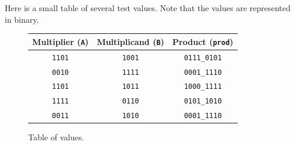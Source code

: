 \documentclass{article}
\renewcommand{\c}[1]{\texttt{#1}}
\begin{document}
Here is a small table of several test values. Note that the
values are represented in binary.

\begin{figure}[h]
    \centering
    \begin{tabular}{c | c | c}
        Multiplier (\c{A}) & Multiplicand (\c{B}) & Product (\c{prod}) \\ \hline
        \c{1101} & \c{1001} & \c{0111\_0101} \\
        \c{0010} & \c{1111} & \c{0001\_1110} \\
        \c{1101} & \c{1011} & \c{1000\_1111} \\
        \c{1111} & \c{0110} & \c{0101\_1010} \\
        \c{0011} & \c{1010} & \c{0001\_1110}
    \end{tabular}
    \caption{Table of values.}
\end{figure}
\end{document}
